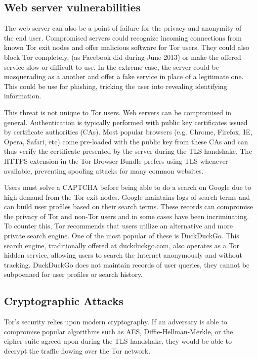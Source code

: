 \documentclass[journal]{IEEEtran}
\begin{document}
\subsection{Web server vulnerabilities}

The web server can also be a point of failure for the privacy and anonymity of the end user. Compromised servers could recognize incoming connections from known Tor exit nodes and offer malicious software for Tor users. They could also block Tor completely, (as Facebook did during June 2013) or make the offered service slow or difficult to use. In the extreme case, the server could be masquerading as a another and offer a fake service in place of a legitimate one. This could be use for phishing, tricking the user into revealing identifying information.

This threat is not unique to Tor users. Web servers can be compromised in general. Authentication is typically performed with public key certificates issued by certificate authorities (CAs). Most popular browsers (e.g. Chrome, Firefox, IE, Opera, Safari, etc) come pre-loaded with the public key from these CAs and can thus verify the certificate presented by the server during the TLS handshake. The HTTPS extension in the Tor Browser Bundle prefers using TLS whenever available, preventing spoofing attacks for many common websites.

Users must solve a CAPTCHA before being able to do a search on Google due to high demand from the Tor exit nodes. Google maintains logs of search terms and can build user profiles based on their search terms. These records can compromise the privacy of Tor and non-Tor users and in some cases have been incriminating. To counter this, Tor recommends that users utilize an alternative and more private search engine. One of the most popular of these is DuckDuckGo. This search engine, traditionally offered at duckduckgo.com, also operates as a Tor hidden service, allowing users to search the Internet anonymously and without tracking. DuckDuckGo does not maintain records of user queries, they cannot be subpoenaed for user profiles or search history.

\subsection{Cryptographic Attacks}

Tor's security relies upon modern cryptography. If an adversary is able to compromise popular algorithms such as AES, Diffie-Hellman-Merkle, or the cipher suite agreed upon during the TLS handshake, they would be able to decrypt the traffic flowing over the Tor network.
\end{document}
